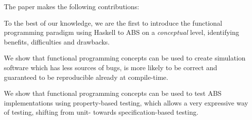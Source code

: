The paper makes the following contributions:

\begin{itemize*}
	\item To the best of our knowledge, we are the first to introduce the functional programming paradigm using Haskell to ABS on a \textit{conceptual} level, identifying benefits, difficulties and drawbacks.
	\item We show that functional programming concepts can be used to create simulation software which has less sources of bugs, is more likely to be correct and guaranteed to be reproducible already at compile-time.
	\item We show that functional programming concepts can be used to test ABS implementations using property-based testing, which allows a very expressive way of testing, shifting from unit- towards specification-based testing.
\end{itemize*}
